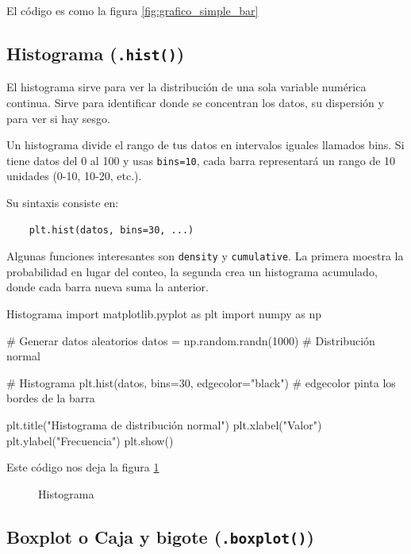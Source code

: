 El código es como la figura \ref{fig:grafico_simple_bar}


\subsection{Histograma (\texttt{.hist()})}

El histograma sirve para ver la distribución de una sola variable numérica continua. Sirve para identificar donde se concentran los datos, su dispersión y para ver si hay sesgo.

Un histograma divide el rango de tus datos en intervalos iguales llamados bins. Si tiene datos del 0 al 100 y usas \texttt{bins=10}, cada barra representará un rango de 10 unidades (0-10, 10-20, etc.). 

Su sintaxis consiste en:
\begin{verbatim}
    plt.hist(datos, bins=30, ...)
\end{verbatim}

\begin{nota}
    Algunas funciones interesantes son \texttt{density} y \texttt{cumulative}. La primera moestra la probabilidad en lugar del conteo, la segunda crea un histograma acumulado, donde cada barra nueva suma la anterior.
\end{nota}

\begin{pycode}{Histograma}
import matplotlib.pyplot as plt
import numpy as np

# Generar datos aleatorios
datos = np.random.randn(1000) # Distribución normal

# Histograma
plt.hist(datos, bins=30, edgecolor="black") # edgecolor pinta los bordes de la barra

plt.title("Histograma de distribución normal")
plt.xlabel("Valor")
plt.ylabel("Frecuencia")
plt.show()    
\end{pycode}

Este código nos deja la figura \ref{fig:grafico_simple_histograma}

\begin{figure}[ht]
    \centering
     
    \caption{Histograma}
    \label{fig:grafico_simple_histograma}
\end{figure}

\subsection{Boxplot o Caja y bigote (\texttt{.boxplot()})}

